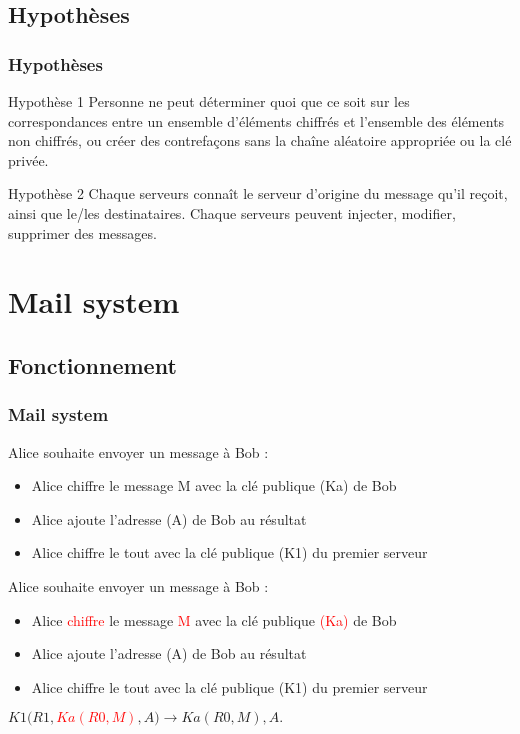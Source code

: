 \documentclass{beamer}
\begin{document}
\subsection{Hypothèses}
\begin{frame}
\frametitle{Hypothèses}
\begin{block}{Hypothèse 1}
Personne ne peut déterminer quoi que ce soit sur les correspondances entre un ensemble d'éléments chiffrés et l'ensemble des éléments non chiffrés, ou créer des contrefaçons sans la chaîne aléatoire appropriée ou la clé privée.
\end{block}
\pause
\begin{block}{Hypothèse 2}
Chaque serveurs connaît le serveur d'origine du message qu'il reçoit, ainsi que le/les destinataires. Chaque serveurs peuvent injecter, modifier, supprimer des messages.
\end{block}

\end{frame}

\section{Mail system}
\subsection{Fonctionnement}
\begin{frame}
\frametitle{Mail system}
Alice souhaite envoyer un message à Bob :
\begin{itemize}
[triangle]
\item Alice chiffre le message M avec la clé publique (Ka) de Bob
\item Alice ajoute l'adresse (A) de Bob au résultat
\item Alice chiffre le tout avec la clé publique (K1) du premier serveur
\end{itemize}
\end{frame}

\begin{frame}
Alice souhaite envoyer un message à Bob :
\begin{itemize}
[triangle]
\item Alice \textcolor{red}{chiffre} le message \textcolor{red}{M} avec la clé publique \textcolor{red}{(Ka)} de Bob
\item Alice ajoute l'adresse (A) de Bob au résultat
\item Alice chiffre le tout avec la clé publique (K1) du premier serveur
\end{itemize}
\begin{center}
$K1( R1, $\textcolor{red}{$Ka( R0, M )$}$, A ) \rightarrow Ka( R0, M ), A.$
\end{center}
\end{frame}
\end{document}

